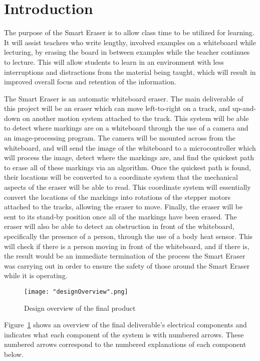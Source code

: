  \section{Introduction}
 The purpose of the Smart Eraser is to allow class time to be utilized for learning. It will assist teachers who write lengthy, involved examples on a whiteboard while lecturing, by erasing the board in between examples while the teacher continues to lecture. This will allow students to learn in an environment with less interruptions and distractions from the material being taught, which will result in improved overall focus and retention of the information.  
 \par
\setlength{\parindent}{2.5ex}The Smart Eraser is an automatic whiteboard eraser. The main deliverable of  this project will be an eraser which can move left-to-right on a track, and up-and-down on another motion system attached to the track. This system will be able to detect where markings are on a whiteboard through the use of a camera and an image-processing program. The camera will be mounted across from the whiteboard, and will send the image of the whiteboard to a microcontroller which will process the image, detect where the markings are, and find the quickest path to erase all of these markings via an algorithm. Once the quickest path is found, their locations will be converted to a coordinate system that the mechanical aspects of the eraser will be able to read. This coordinate system will essentially convert the locations of the markings into rotations of the stepper motors attached to the tracks, allowing the eraser to move. Finally, the eraser will be sent to its stand-by position once all of the markings have been erased. The eraser will also be able to detect an obstruction in front of the whiteboard, specifically the presence of a person, through the use of a body heat sensor. This will check if there is a person moving in front of the whiteboard, and if there is, the result would be an immediate termination of the process the Smart Eraser was carrying out in order to ensure the safety of those around the Smart Eraser while it is operating.

\begin{figure}[H]
	\centering
	{\texttt{[image: "designOverview".png]}}
	\caption{Design overview of the final product}
	\label{fig:rough}
\end{figure}

Figure~\ref{fig:rough} shows an overview of the final deliverable's electrical components and indicates what each component of the system is with numbered arrows. These numbered arrows correspond to the numbered explanations of each component below.

